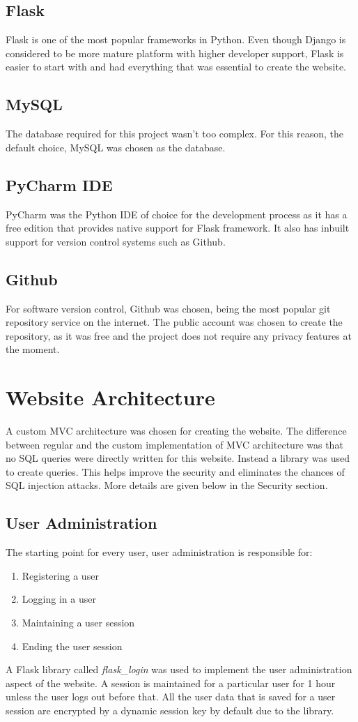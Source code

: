 \subsection{Flask}
Flask is one of the most popular frameworks in Python. Even though Django is considered to be more mature platform with higher developer support, Flask is easier to start with and had everything that was essential to create the website. 

\subsection{MySQL}
The database required for this project wasn't too complex. For this reason, the default choice, MySQL was chosen as the database.

\subsection{PyCharm IDE}
PyCharm was the Python IDE of choice for the development process as it has a free edition that provides native support for Flask framework. It also has inbuilt support for version control systems such as Github.

\subsection{Github}
For software version control, Github was chosen, being the most popular git repository service on the internet. The public account was chosen to create the repository, as it was free and the project does not require any privacy features at the moment.

\section{Website Architecture}
A custom MVC architecture was chosen for creating the website. The difference between regular and the custom implementation of MVC architecture was that no SQL queries were directly written for this website. Instead a library was used to create queries. This helps improve the security and eliminates the chances of SQL injection attacks. More details are given below in the Security section.

\subsection{User Administration}
The starting point for every user, user administration is responsible for:
\begin{enumerate}
    \item Registering a user
    \item Logging in a user
    \item Maintaining a user session
    \item Ending the user session
\end{enumerate}
A Flask library called \textit{flask\_login} was used to implement the user administration aspect of the website. A session is maintained for a particular user for 1 hour unless the user logs out before that. All the user data that is saved for a user session are encrypted by a dynamic session key by default due to the library.

